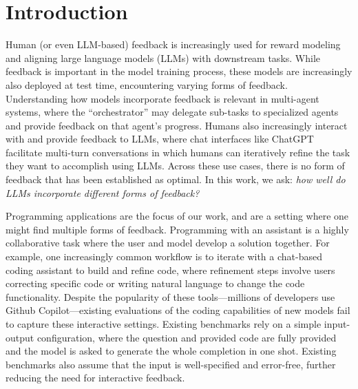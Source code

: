 


\section{Introduction}


Human (or even LLM-based) feedback is increasingly used for reward modeling and aligning large language models (LLMs) with downstream tasks. 
While feedback is important in the model training process, these models are increasingly also deployed at test time, encountering varying forms of feedback.
Understanding how models incorporate feedback is relevant in multi-agent systems, where the ``orchestrator'' may delegate sub-tasks to specialized agents and provide feedback on that agent's progress.
Humans also increasingly interact with and provide feedback to LLMs, where chat interfaces like ChatGPT facilitate multi-turn conversations in which humans can iteratively refine the task they want to accomplish using LLMs.
Across these use cases, there is no form of feedback that has been established as optimal.
In this work, we ask: \textit{how well do LLMs incorporate different forms of feedback?}

Programming applications are the focus of our work, and are a setting where one might find multiple forms of feedback.
Programming with an assistant is a highly collaborative task where the user and model develop a solution together.
For example, one increasingly common workflow is to iterate with a chat-based coding assistant to build and refine code, where refinement steps involve users correcting specific code or writing natural language to change the code functionality. 
Despite the popularity of these tools---millions of developers use Github Copilot---existing
evaluations of the coding capabilities of new models fail to capture these interactive settings.
Existing benchmarks rely on a simple input-output configuration, where the question and provided code are fully provided and the model is asked to generate the whole completion in one shot. 
Existing benchmarks also assume that the input is well-specified and error-free, further reducing the need for interactive feedback.

 


